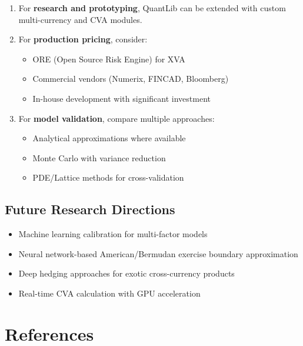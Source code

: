 \documentclass[conference]{IEEEtran}
\theoremstyle{definition}
\begin{document}
\begin{enumerate}
    \item For \textbf{research and prototyping}, QuantLib can be extended with custom multi-currency and CVA modules.

    \item For \textbf{production pricing}, consider:
    \begin{itemize}
        \item ORE (Open Source Risk Engine) for XVA
        \item Commercial vendors (Numerix, FINCAD, Bloomberg)
        \item In-house development with significant investment
    \end{itemize}

    \item For \textbf{model validation}, compare multiple approaches:
    \begin{itemize}
        \item Analytical approximations where available
        \item Monte Carlo with variance reduction
        \item PDE/Lattice methods for cross-validation
    \end{itemize}
\end{enumerate}

\subsection{Future Research Directions}

\begin{itemize}
    \item Machine learning calibration for multi-factor models
    \item Neural network-based American/Bermudan exercise boundary approximation
    \item Deep hedging approaches for exotic cross-currency products
    \item Real-time CVA calculation with GPU acceleration
\end{itemize}

\section*{References}
\end{document}
